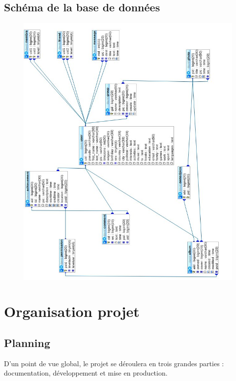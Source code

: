 \documentclass{life-fr}
\begin{document}
\section{Schéma de la base de données}

\begin{figure}[H]
  \begin{center}
    \includegraphics[width=18cm]{img/imgdb.jpg}
  \end{center}
\end{figure}

\chapter{Organisation projet}

\section{Planning}

D'un point de vue global, le projet se déroulera en trois grandes parties : documentation, développement et mise en production.\\
\end{document}
